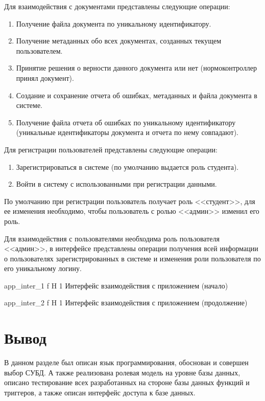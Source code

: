 Для взаимодействия с документами представлены следующие операции:
\begin{enumerate}
	\item Получение файла документа по уникальному идентификатору.
	\item Получение метаданных обо всех документах, созданных текущем
	пользователем.
	\item Принятие решения о верности данного документа или нет (нормоконтроллер
	принял документ).
	\item Создание и сохранение отчета об ошибках, метаданных и файла документа в
	системе.
	\item Получение файла отчета об ошибках по уникальному идентификатору
	(уникальные идентификаторы документа и отчета по нему совпадают).
\end{enumerate}

Для регистрации пользователей представлены следующие операции:
\begin{enumerate}
	\item Зарегистрироваться в системе (по умолчанию выдается роль студента).
	\item Войти в систему с использованными при регистрации данными.
\end{enumerate}
По умолчанию при регистрации пользователь получает роль <<студент>>, для ее
изменения необходимо, чтобы пользователь с ролью <<админ>> изменил его роль.

Для взаимодействия с пользователями необходима роль пользователя <<админ>>, в
интерфейсе представлены операции получения всей информации о пользователях зарегистрированных в системе и изменения роли пользователя по его уникальному логину.



{app_inter_1} %
{f} %
{H} %
{1\textwidth} %
{Интерфейс взаимодействия с приложением (начало)} %


{app_inter_2} %
{f} %
{H} %
{1\textwidth} %
{Интерфейс взаимодействия с приложением (продолжение)} %

\section*{Вывод}
В данном разделе был описан язык программирования, обоснован и совершен  выбор
СУБД. А также реализована ролевая модель на уровне базы данных, описано
тестирование всех разработанных на стороне базы данных функций и триггеров, а
также описан интерфейс доступа к базе данных. 












